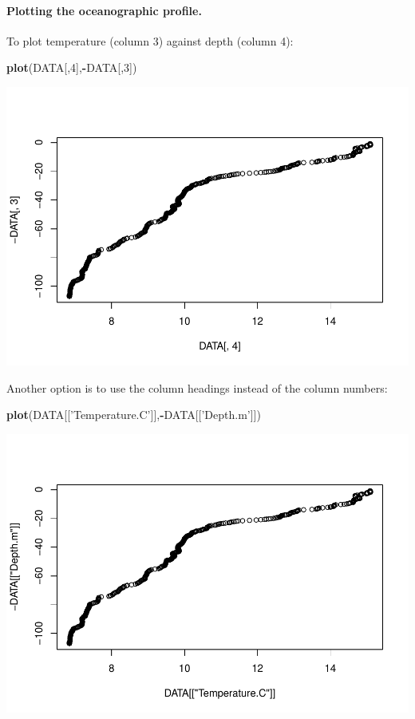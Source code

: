 \documentclass[
]{article}
\newenvironment{Shaded}{\begin{snugshade}}{\end{snugshade}}
\newcommand{\DecValTok}[1]{\textcolor[rgb]{0.00,0.00,0.81}{#1}}
\newcommand{\KeywordTok}[1]{\textcolor[rgb]{0.13,0.29,0.53}{\textbf{#1}}}
\newcommand{\NormalTok}[1]{#1}
\newcommand{\OperatorTok}[1]{\textcolor[rgb]{0.81,0.36,0.00}{\textbf{#1}}}
\newcommand{\StringTok}[1]{\textcolor[rgb]{0.31,0.60,0.02}{#1}}
\begin{document}
\hypertarget{plotting-the-oceanographic-profile.}{%
\paragraph{Plotting the oceanographic
profile.}\label{plotting-the-oceanographic-profile.}}

To plot temperature (column 3) against depth (column 4):

\begin{Shaded}
\begin{Highlighting}[]
\KeywordTok{plot}\NormalTok{(DATA[,}\DecValTok{4}\NormalTok{],}\OperatorTok{-}\NormalTok{DATA[,}\DecValTok{3}\NormalTok{])}
\end{Highlighting}
\end{Shaded}

\includegraphics{dataVisualization-classNotes_files/figure-latex/unnamed-chunk-12-1.pdf}

Another option is to use the column headings instead of the column
numbers:

\begin{Shaded}
\begin{Highlighting}[]
\KeywordTok{plot}\NormalTok{(DATA[[}\StringTok{'Temperature.C'}\NormalTok{]],}\OperatorTok{-}\NormalTok{DATA[[}\StringTok{'Depth.m'}\NormalTok{]])}
\end{Highlighting}
\end{Shaded}

\includegraphics{dataVisualization-classNotes_files/figure-latex/unnamed-chunk-13-1.pdf}
\end{document}
